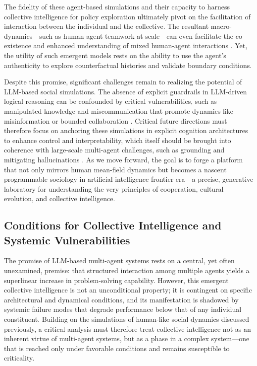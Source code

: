 \documentclass[11pt,a4paper]{article}
\begin{document}
The fidelity of these agent-based simulations and their capacity to harness collective intelligence for policy exploration ultimately pivot on the facilitation of interaction between the individual and the collective. The resultant macro-dynamics---such as human-agent teamwork at-scale---can even facilitate the co-existence and enhanced understanding of mixed human-agent interactions \cite{arxiv:2006.07301v2}. Yet, the utility of such emergent models rests on the ability to use the agent's authenticity to explore counterfactual histories and validate boundary conditions.

Despite this promise, significant challenges remain to realizing the potential of LLM-based social simulations. The absence of explicit guardrails in LLM-driven logical reasoning can be confounded by critical vulnerabilities, such as manipulated knowledge and miscommunication that promote dynamics like misinformation or bounded collaboration \cite{arxiv:2312.17515v1}. Critical future directions must therefore focus on anchoring these simulations in explicit cognition architectures to enhance control and interpretability, which itself should be brought into coherence with large-scale multi-agent challenges, such as grounding and mitigating hallucinations \cite{arxiv:2407.07791v2,arxiv:2312.17515v1}. As we move forward, the goal is to forge a platform that not only mirrors human mean-field dynamics but becomes a nascent programmable sociology in artificial intelligence frontier era---a precise, generative laboratory for understanding the very principles of cooperation, cultural evolution, and collective intelligence.


\subsection{Conditions for Collective Intelligence and Systemic Vulnerabilities}


The promise of LLM-based multi-agent systems rests on a central, yet often unexamined, premise: that structured interaction among multiple agents yields a superlinear increase in problem-solving capability. However, this emergent collective intelligence is not an unconditional property; it is contingent on specific architectural and dynamical conditions, and its manifestation is shadowed by systemic failure modes that degrade performance below that of any individual constituent. Building on the simulations of human-like social dynamics discussed previously, a critical analysis must therefore treat collective intelligence not as an inherent virtue of multi-agent systems, but as a phase in a complex system---one that is reached only under favorable conditions and remains susceptible to criticality.
\end{document}
